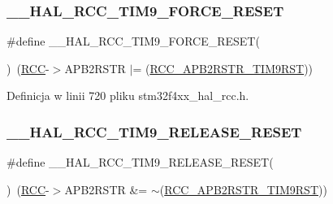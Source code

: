 \subsubsection{\texorpdfstring{\+\_\+\+\_\+\+H\+A\+L\+\_\+\+R\+C\+C\+\_\+\+T\+I\+M9\+\_\+\+F\+O\+R\+C\+E\+\_\+\+R\+E\+S\+ET}{\_\_HAL\_RCC\_TIM9\_FORCE\_RESET}}
{\footnotesize\ttfamily \#define \+\_\+\+\_\+\+H\+A\+L\+\_\+\+R\+C\+C\+\_\+\+T\+I\+M9\+\_\+\+F\+O\+R\+C\+E\+\_\+\+R\+E\+S\+ET(\begin{DoxyParamCaption}{ }\end{DoxyParamCaption})~(\hyperlink{group___peripheral__declaration_ga74944438a086975793d26ae48d5882d4}{R\+CC}-\/$>$A\+P\+B2\+R\+S\+TR $\vert$= (\hyperlink{group___peripheral___registers___bits___definition_gab3aa588d4814a289d939e111492724af}{R\+C\+C\+\_\+\+A\+P\+B2\+R\+S\+T\+R\+\_\+\+T\+I\+M9\+R\+ST}))}



Definicja w linii 720 pliku stm32f4xx\+\_\+hal\+\_\+rcc.\+h.

\mbox{\label{group___r_c_c___a_p_b2___force___release___reset_ga71fee37e3aff2c5040e2e9f4e153f4ff}} 
\subsubsection{\texorpdfstring{\+\_\+\+\_\+\+H\+A\+L\+\_\+\+R\+C\+C\+\_\+\+T\+I\+M9\+\_\+\+R\+E\+L\+E\+A\+S\+E\+\_\+\+R\+E\+S\+ET}{\_\_HAL\_RCC\_TIM9\_RELEASE\_RESET}}
{\footnotesize\ttfamily \#define \+\_\+\+\_\+\+H\+A\+L\+\_\+\+R\+C\+C\+\_\+\+T\+I\+M9\+\_\+\+R\+E\+L\+E\+A\+S\+E\+\_\+\+R\+E\+S\+ET(\begin{DoxyParamCaption}{ }\end{DoxyParamCaption})~(\hyperlink{group___peripheral__declaration_ga74944438a086975793d26ae48d5882d4}{R\+CC}-\/$>$A\+P\+B2\+R\+S\+TR \&= $\sim$(\hyperlink{group___peripheral___registers___bits___definition_gab3aa588d4814a289d939e111492724af}{R\+C\+C\+\_\+\+A\+P\+B2\+R\+S\+T\+R\+\_\+\+T\+I\+M9\+R\+ST}))}



